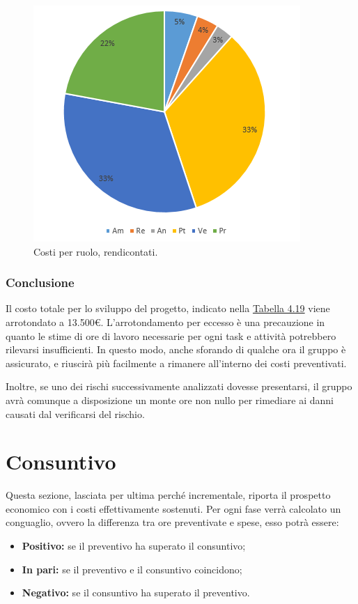 \documentclass[a4paper]{article}
\begin{document}
				\begin{figure}[H]
					\centering
					\includegraphics[scale=0.7]{pc_costi_rendicontate}
					\caption{Costi per ruolo, rendicontati.}
				\end{figure}
				
			\subsubsection{Conclusione}
				Il costo totale per lo sviluppo del progetto, indicato nella \hyperref[TCRendicontati]{Tabella 4.19} viene 
				arrotondato a 13.500\euro. L'arrotondamento per eccesso è una precauzione in quanto le stime di ore di lavoro 
				necessarie per ogni task e attività potrebbero rilevarsi insufficienti. In questo modo, anche sforando di qualche 
				ora il gruppo è assicurato, e riuscirà più facilmente a rimanere all'interno dei costi preventivati.
				
				Inoltre, se uno dei rischi successivamente analizzati dovesse presentarsi, il gruppo avrà comunque a disposizione 
				un monte ore non nullo per rimediare ai danni causati dal verificarsi del rischio.

	\newpage 
	\section{Consuntivo}
	\label{Consuntivo}
	
		Questa sezione, lasciata per ultima perché incrementale, riporta il prospetto economico con i 
		costi effettivamente sostenuti. Per ogni fase verrà calcolato un conguaglio, ovvero la differenza
		tra ore preventivate e spese, esso potrà essere:
		\begin{itemize}
			\item \textbf{Positivo:} se il preventivo ha superato il consuntivo;
			\item \textbf{In pari:} se il preventivo e il consuntivo coincidono;
			\item \textbf{Negativo:} se il consuntivo ha superato il preventivo.
		\end{itemize}
		
\end{document}
